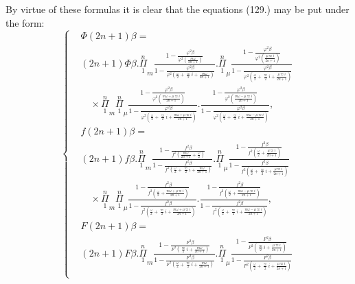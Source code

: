 \documentclass{article}
\begin{document}
By virtue of these formulas it is clear that the equations (129.) may be put under the form:
\[ \left\{\begin{aligned}
&\Phi(2n+1)\beta=\\
&(2n+1)\Phi\beta.\overset{n}{\underset{1}{\Pi}}_{m}\frac{1-\frac{\varphi^{2}\beta}{\varphi^{2}\left(\frac{m\omega}{2n+1}\right)}}{1-\frac{\varphi^{2}\beta}{\varphi^{2}\left(\frac{\omega}{2}+\frac{\varpi}{2}i+\frac{m\omega}{2n+1}\right)}}.\overset{n}{\underset{1}{\Pi}}_{\mu}\frac{1-\frac{\varphi^{2}\beta}{\varphi^{2}\left(\frac{\mu\varpi i}{2n+1}\right)}}{1-\frac{\varphi^{2}\beta}{\varphi^{2}\left(\frac{\omega}{2}+\frac{\varpi}{2}i+\frac{\mu\varpi i}{2n+1}\right)}}\\
&\quad\times\overset{n}{\underset{1}{\Pi}}_{m}\overset{n}{\underset{1}{\Pi}}_{\mu}\frac{1-\frac{\varphi^{2}\beta}{\varphi^{2}\left(\frac{m\omega+\mu\varpi i}{2n+1}\right)}}{1-\frac{\varphi^{2}\beta}{\varphi^{2}\left(\frac{\omega}{2}+\frac{\varpi}{2}i+\frac{m\omega+\mu\varpi i}{2n+1}\right)}}.\frac{1-\frac{\varphi^{2}\beta}{\varphi^{2}\left(\frac{m\omega-\mu\varpi i}{2n+1}\right)}}{1-\frac{\varphi^{2}\beta}{\varphi^{2}\left(\frac{\omega}{2}+\frac{\varpi}{2}i+\frac{m\omega-\mu\varpi i}{2n+1}\right)}},\\
&f(2n+1)\beta=\\
&(2n+1)f\beta.\overset{n}{\underset{1}{\Pi}}_{m}\frac{1-\frac{f^{2}\beta}{f^{2}\left(\frac{m\omega}{2n+1}+\frac{\omega}{2}\right)}}{1-\frac{f^{2}\beta}{f^{2}\left(\frac{\omega}{2}+\frac{\varpi}{2}i+\frac{m\omega}{2n+1}\right)}}.\overset{n}{\underset{1}{\Pi}}_{\mu}\frac{1-\frac{f^{2}\beta}{f^{2}\left(\frac{\omega}{2}+\frac{\mu\varpi i}{2n+1}\right)}}{1-\frac{f^{2}\beta}{f^{2}\left(\frac{\omega}{2}+\frac{\varpi}{2}i+\frac{\mu\varpi i}{2n+1}\right)}}\\
&\quad\times\overset{n}{\underset{1}{\Pi}}_{m}\overset{n}{\underset{1}{\Pi}}_{\mu}\frac{1-\frac{f^{2}\beta}{f^{2}\left(\frac{\omega}{2}+\frac{m\omega+\mu\varpi i}{2n+1}\right)}}{1-\frac{f^{2}\beta}{f^{2}\left(\frac{\omega}{2}+\frac{\varpi}{2}i+\frac{m\omega+\mu\varpi i}{2n+1}\right)}}.\frac{1-\frac{f^{2}\beta}{f^{2}\left(\frac{\omega}{2}+\frac{m\omega-\mu\varpi i}{2n+1}\right)}}{1-\frac{f^{2}\beta}{f^{2}\left(\frac{\omega}{2}+\frac{\varpi}{2}i+\frac{m\omega-\mu\varpi i}{2n+1}\right)}},\\
&F(2n+1)\beta=\\
&(2n+1)F\beta.\overset{n}{\underset{1}{\Pi}}_{m}\frac{1-\frac{F^{2}\beta}{F^{2}\left(\frac{\varpi}{2}i+\frac{m\omega}{2n+1}\right)}}{1-\frac{F^{2}\beta}{F^{2}\left(\frac{\omega}{2}+\frac{\varpi}{2}i+\frac{m\omega}{2n+1}\right)}}.\overset{n}{\underset{1}{\Pi}}_{\mu}\frac{1-\frac{F^{2}\beta}{F^{2}\left(\frac{\varpi}{2}i+\frac{\mu\varpi i}{2n+1}\right)}}{1-\frac{F^{2}\beta}{F^{2}\left(\frac{\omega}{2}+\frac{\varpi}{2}i+\frac{\mu\varpi i}{2n+1}\right)}}\\

\end{aligned}\]
\end{document}
